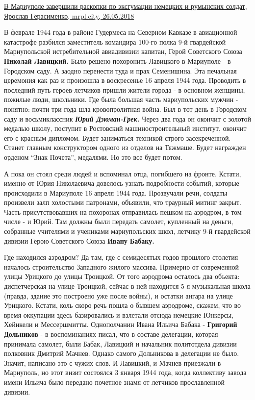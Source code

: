 \href{https://mrpl.city/news/view/v-mariupole-zavershili-raskopki-po-e-ksgumatsii-nemetskih-i-rumynskih-soldat}{%
В Мариуполе завершили раскопки по эксгумации немецких и румынских солдат, Ярослав Герасименко, mrpl.city, 26.05.2018}

В феврале 1944 года в районе Гудермеса на Северном Кавказе в авиационной
катастрофе разбился заместитель командира 100-го полка 9-й гвардейской
Мариупольской истребительной авиадивизии капитан, Герой Советского Союза
\textbf{Николай Лавицкий.} Было решено похоронить Лавицкого в Мариуполе - в
Городском саду. А заодно перенести туда и прах Семенишина. Эта печальная
церемония как раз и произошла в воскресенье 16 апреля 1944 года. Проводить в
последний путь героев-летчиков пришли жители города - в основном женщины,
пожилые люди, школьники. Где была большая часть мариупольских мужчин - понятно:
почти три года шла кровопролитная война. Был в тот день в Городском саду и
восьмиклассник \emph{\textbf{Юрий Дзюман-Грек.}} Через два года он окончит с
золотой медалью школу, поступит в Ростовский машиностроительный институт,
окончит его с красным дипломом. Будет заниматься техникой строго засекреченной.
Станет главным конструктором одного из отделов на Тяжмаше. Будет награжден
орденом \enquote{Знак Почета}, медалями. Но это все будет потом.

А пока он стоял среди людей и вспоминал отца, погибшего на фронте. Кстати,
именно от Юрия Николаевича довелось узнать подробности событий, которые
происходили в Мариуполе 16 апреля 1944 года. Прозвучали речи, солдаты произвели
залп холостыми патронами, объявили, что траурный митинг закрыт. Часть
присутствовавших на похоронах отправилась пешком на аэродром, в том числе - и
Юрий. Там должны были передать самолет, купленный на деньги, собранные
учителями и учениками мариупольских школ, летчику 9-й гвардейской дивизии Герою
Советского Союза \textbf{Ивану Бабаку.} 

Где находился аэродром? Да там, где с семидесятых годов прошлого столетия
началось строительство Западного жилого массива. Примерно от современной улицы
Урицкого до улицы Троицкой. От того аэродрома осталось два объекта:
диспетчерская на улице Троицкой, сейчас в ней находится 5-я музыкальная школа
(правда, здание это построено уже после войны), и остатки ангара на улице
Урицкого. Кстати, коль скоро речь пошла о бывшем аэродроме, скажем, что во
время оккупации здесь базировались и взлетали отсюда немецкие Юнкерсы, Хейнкели
и Мессершмитты. Однополчанин Ивана Ильича Бабака - \textbf{Григорий Дольников} - в
воспоминаниях писал, что в составе делегации, которая принимала самолет, были
Бабак, Лавицкий и начальник политотдела дивизии полковник Дмитрий Мачнев.
Однако самого Дольникова в делегации не было. Значит, написано это с чужих
слов. И Лавицкий, и Мачнев приезжали в Мариуполь, но этот визит состоялся 3
января 1944 года, когда коллективу завода имени Ильича было передано почетное
знамя от летчиков прославленной дивизии.

